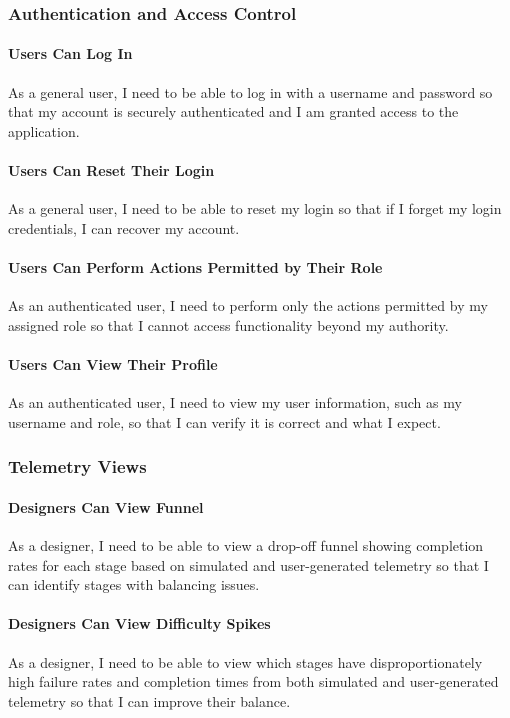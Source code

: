 \subsubsection{Authentication and Access Control}

\paragraph{Users Can Log In}
As a general user, I need to be able to log in with a username and password so that my account is securely authenticated and I am granted access to the application.

\paragraph{Users Can Reset Their Login}
As a general user, I need to be able to reset my login so that if I forget my login credentials, I can recover my account.

\paragraph{Users Can Perform Actions Permitted by Their Role}
As an authenticated user, I need to perform only the actions permitted by my assigned role so that I cannot access functionality beyond my authority.

\paragraph{Users Can View Their Profile}
As an authenticated user, I need to view my user information, such as my username and role, so that I can verify it is correct and what I expect.

\subsubsection{Telemetry Views}

\paragraph{Designers Can View Funnel}
As a designer, I need to be able to view a drop-off funnel showing completion rates for each stage based on simulated and user-generated telemetry so that I can identify stages with balancing issues.

\paragraph{Designers Can View Difficulty Spikes}
As a designer, I need to be able to view which stages have disproportionately high failure rates and completion times from both simulated and user-generated telemetry so that I can improve their balance.


